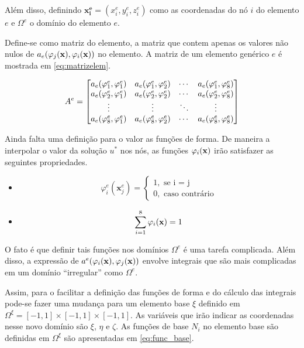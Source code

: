 Além disso, definindo $\mathbf{x^e_i} = (x^e_i, y^e_i, z^e_i)$ como as coordenadas do nó $i$ do elemento $e$ e $\Omega^e$ o domínio do elemento $e$.



Define-se como matriz do elemento, a matriz que contem apenas os valores não nulos de $a_e(\varphi_j(\mathbf{x}),\varphi_i(\mathbf{x}))$ no elemento. A matriz de um elemento genérico $e$ é mostrada em \ref{eq:matrizelem}.

\begin{equation}
\label{eq:matrizelem}
A^e = \begin{bmatrix} a_e(\varphi^e_{1}, \varphi^e_{1}) & a_e(\varphi^e_{1}, \varphi^e_{2}) & \cdots & a_e(\varphi^e_{1}, \varphi^e_{8}) \\ a_e(\varphi^e_{2}, \varphi^e_{1}) & a_e(\varphi^e_{2}, \varphi^e_{2}) & \cdots & a_e(\varphi^e_{2}, \varphi^e_{8}) \\ \vdots & \vdots & \ddots & \vdots \\ a_e(\varphi^e_{8}, \varphi^e_{1}) & a_e(\varphi^e_{8}, \varphi^e_{2}) & \cdots & a_e(\varphi^e_{8}, \varphi^e_{8}) \\ \end{bmatrix}
\end{equation}


Ainda falta uma definição para o valor as funções de forma. De maneira a interpolar o valor da solução $u^*$ nos nós, as funções $\varphi_i(\mathbf{x})$ irão satisfazer as seguintes propriedades.

\begin{itemize}
\item \begin{equation}\label{eq:func_cond1}
\varphi^e_i(\mathbf{x}^e_j) = \left\{\begin{matrix} 1, \text{ se i = j} \\  0, \text{ caso contrário} \end{matrix}\right.
\end{equation}
\item \begin{equation}\label{eq:func_cond2}
    \sum_{i=1}^8 \varphi_i(\mathbf{x}) = 1
\end{equation}
\end{itemize}


O fato é que definir tais funções nos domínios $\Omega^e$ é uma tarefa complicada. Além disso, a expressão de $a^e(\varphi_i(\mathbf{x}),\varphi_j(\mathbf{x}))$ envolve integrais que são mais complicadas em um domínio {\color{red}``irregular''} como $\Omega^e$.


Assim, para o facilitar a definição das funções de forma e do cálculo das integrais pode-se fazer uma mudança para um elemento base $\xi$ definido em $\Omega^\xi = [-1,1]\times[-1,1]\times[-1,1]$. As variáveis que irão indicar as coordenadas nesse novo domínio são $\xi$, $\eta$ e $\zeta$. As funções de base $N_i$ no elemento base são definidas em $\Omega^\xi$ são apresentadas em \ref{eq:func_base}.

